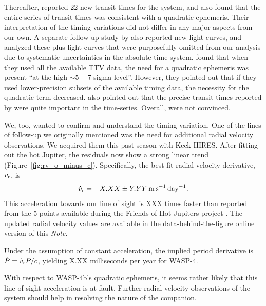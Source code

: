 \documentclass[RNAAS]{aastex62}
\begin{document}
Thereafter, \citet{southworth_transit_2019} reported 22 new transit
times for the system, and also found that the entire series of transit
times was consistent with a quadratic ephemeris.  Their interpretation
of the timing variations did not differ in any major aspects from our own.  A
separate follow-up study by \citet{baluev_homogeneously_2019} also reported
new light curves, and analyzed these plus light curves that were
purposefully omitted from our analysis due to systematic uncertainties
in the absolute time system.  \citeauthor{baluev_homogeneously_2019}
found that when they used all the available TTV data, the need for a
quadratic ephemeris was present ``at the high $\sim 5-7$ sigma
level''.  However, they pointed out that if they used lower-precision
subsets of the available timing data, the necessity for the quadratic
term decreased.  \citeauthor{baluev_homogeneously_2019} also pointed
out that the precise transit times reported by
\citet{huitson_gemini_2017} were quite important in the time-series.
Overall, \citeauthor{baluev_homogeneously_2019} were not convinced.

We, too, wanted to confirm and understand the timing variation.  One
of the lines of follow-up we originally mentioned
was the need for additional radial velocity
observations.  We acquired them this past season with Keck HIRES.
After fitting out the hot Jupiter, the residuals now
show a strong linear trend  (Figure~\ref{fig:rv_o_minus_c}).
Specifically, the best-fit radial velocity derivative, $\dot{v}_{\rm
r}$, is
\begin{equation}
  \dot{v}_{\rm r} = - X.XX \pm Y.YY\,{\rm m\,s^{-1}\,day^{-1}}.
\end{equation}
This acceleration towards our line of sight is XXX times faster than 
reported from the 5 points available during the Friends of Hot
Jupiters project \citep{knutson_friends_2014}.
The updated radial velocity values are available in the
data-behind-the-figure online version of this {\it Note}.

Under the assumption of constant acceleration, the implied period
derivative is $\dot{P} = \dot{v}_{\rm r} P / c$, yielding X.XX
milliseconds per year for WASP-4.


With respect to WASP-4b's quadratic ephemeris, it seems rather
likely that this line of sight acceleration is at fault.
Further radial velocity observations of the system should help in
resolving the nature of the companion.



\end{document}

